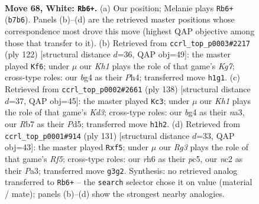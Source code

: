 \documentclass[11pt]{article}
\begin{document}
\clearpage

\begin{figure}[p]\centering
\begin{subfigure}{0.46\textwidth}\centering
\resizebox{\linewidth}{!}{%
\newchessgame
\chessboard[
  setfen={8/1R6/6kr/8/r5bB/6R1/2n2P2/7K w - - 15 68},
  showmover=false,
  pgfstyle=straightmove, color=movearrow, markmove={b7-b6}
]}
\caption{}
\end{subfigure}\hfill
\begin{subfigure}{0.46\textwidth}\centering
\resizebox{\linewidth}{!}{%
\newchessgame
\chessboard[
  setfen={8/6K1/8/3k2B1/4b1rP/4R3/8/8 w - - 17 62},
  showmover=false,
  pgfstyle=straightmove, color=movearrow, markmove={g7-f6}
]}
\caption{}
\end{subfigure}
\\[4pt]
\begin{subfigure}{0.46\textwidth}\centering
\resizebox{\linewidth}{!}{%
\newchessgame
\chessboard[
  setfen={8/r3k3/3p4/3P4/8/nB1K4/R7/8 w - - 7 70},
  showmover=false,
  pgfstyle=straightmove, color=movearrow, markmove={d3-c3}
]}
\caption{}
\end{subfigure}\hfill
\begin{subfigure}{0.46\textwidth}\centering
\resizebox{\linewidth}{!}{%
\newchessgame
\chessboard[
  setfen={5R2/8/8/1KP1kBp1/5r2/p7/8/8 b - - 0 66},
  showmover=false,
  pgfstyle=straightmove, color=movearrow, markmove={f4-f5}
]}
\caption{}
\end{subfigure}
\caption{\textbf{Move 68, White: \texttt{Rb6+}.} (a) Our position; Melanie plays \texttt{Rb6+} (\texttt{b7b6}). Panels (b)--(d) are the retrieved master positions whose correspondence most drove this move (highest QAP objective among those that transfer to it). (b) Retrieved from \texttt{ccrl\_top\_p0003\#2217} (ply 122) [structural distance $d$=36, QAP obj=49]: the master played \texttt{Kf6}; under $\mu$ our \emph{Kh1} plays the role of that game's \emph{Kg7}; cross-type roles: our \emph{b}g4 as their \emph{P}h4; transferred move \texttt{h1g1}. (c) Retrieved from \texttt{ccrl\_top\_p0002\#2661} (ply 138) [structural distance $d$=37, QAP obj=45]: the master played \texttt{Kc3}; under $\mu$ our \emph{Kh1} plays the role of that game's \emph{Kd3}; cross-type roles: our \emph{b}g4 as their \emph{n}a3, our \emph{R}b7 as their \emph{P}d5; transferred move \texttt{h1h2}. (d) Retrieved from \texttt{ccrl\_top\_p0001\#914} (ply 131) [structural distance $d$=33, QAP obj=43]: the master played \texttt{Rxf5}; under $\mu$ our \emph{Rg3} plays the role of that game's \emph{Rf5}; cross-type roles: our \emph{r}h6 as their \emph{p}c5, our \emph{n}c2 as their \emph{P}a3; transferred move \texttt{g3g2}. Synthesis: no retrieved analog transferred to \texttt{Rb6+} -- the \texttt{search} selector chose it on value (material / mate); panels (b)--(d) show the strongest nearby analogies.}
\label{fig:thought-m134}
\end{figure}
\end{document}
